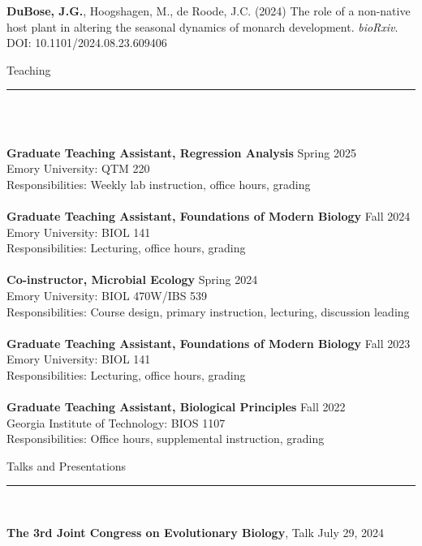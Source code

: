 \documentclass{article}
\begin{document}
\hangindent=0.7cm \textbf{DuBose, J.G.}, Hoogshagen, M., de Roode, J.C. (2024) The role of a non-native host plant in altering the seasonal dynamics of monarch development. \emph{bioRxiv}. \\
DOI: 10.1101/2024.08.23.609406 \\


\begin{flushleft}
{\Large Teaching} \rule{16.51cm}{0.4pt}\\
\end{flushleft}

\\
\textbf{Graduate Teaching Assistant, Regression Analysis} \hfill Spring 2025 \\
Emory University: QTM 220\\
Responsibilities: Weekly lab instruction, office hours, grading 
\\
\\
\textbf{Graduate Teaching Assistant, Foundations of Modern Biology} \hfill Fall 2024 \\
Emory University: BIOL 141\\
Responsibilities: Lecturing, office hours, grading 
\\
\\
\textbf{Co-instructor, Microbial Ecology} \hfill Spring 2024 \\
Emory University: BIOL 470W/IBS 539\\
Responsibilities: Course design, primary instruction, lecturing, discussion leading
\\
\\
\textbf{Graduate Teaching Assistant, Foundations of Modern Biology} \hfill Fall 2023 \\
Emory University: BIOL 141\\
Responsibilities: Lecturing, office hours, grading 
\\
\\
\textbf{Graduate Teaching Assistant, Biological Principles} \hfill Fall 2022\\
Georgia Institute of Technology: BIOS 1107 \\
Responsibilities: Office hours, supplemental instruction, grading
\\
\begin{flushleft}
{\Large Talks and Presentations} \rule{16.51cm}{0.4pt}\\
\end{flushleft}
\textbf{The 3rd Joint Congress on Evolutionary Biology}, Talk \hfill July 29, 2024\\
\end{document}
